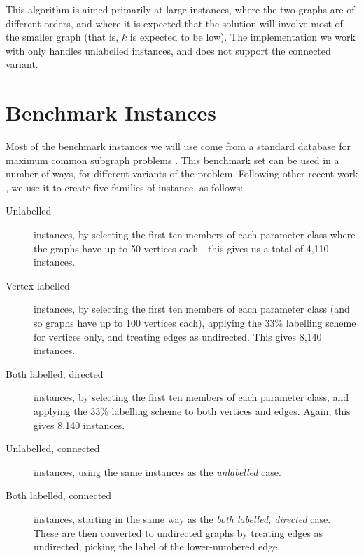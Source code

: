 \documentclass[sigconf]{acmart}
\begin{document}
This algorithm is aimed primarily at large instances, where the two graphs are of different orders,
and where it is expected that the solution will involve most of the smaller graph (that is, $k$ is
expected to be low). The implementation we work with only handles unlabelled instances, and does
not support the connected variant.

\section{Benchmark Instances}

Most of the benchmark instances we will use come from a standard database for maximum common
subgraph problems \citep{DBLP:journals/prl/SantoFSV03,DBLP:journals/jgaa/ConteFV07}. This benchmark
set can be used in a number of ways, for different variants of the problem. Following other recent
work \citep{DBLP:conf/cp/McCreeshNPS16,DBLP:conf/aaai/HoffmannMR17,o:McCreeshPT17}, we use it to
create five families of instance, as follows:

\begin{description}
    \item[Unlabelled] instances, by selecting the first ten members of each parameter class where the
        graphs have up to 50 vertices each---this gives us a total of 4,110 instances.

    \item[Vertex labelled] instances, by selecting the first ten members of each parameter class
        (and so graphs have up to 100 vertices each), applying the 33\% labelling scheme for
        vertices only, and treating edges as undirected. This gives 8,140 instances.

    \item[Both labelled, directed] instances, by selecting the first ten members of each parameter
        class, and applying the 33\% labelling scheme to both vertices and edges. Again, this gives
        8,140 instances.

    \item[Unlabelled, connected] instances, using the same instances as the \emph{unlabelled} case.

    \item[Both labelled, connected] instances, starting in the same way as the \emph{both labelled,
        directed} case. These are then converted to undirected graphs by treating edges as
        undirected, picking the label of the lower-numbered edge.
\end{description}
\end{document}
